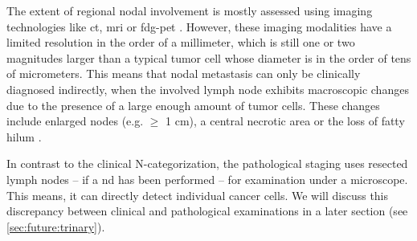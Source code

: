 \documentclass[\relativeRoot/main.tex]{subfiles}
\begin{document}
The extent of regional nodal involvement is mostly assessed using imaging technologies like \gls{ct}, \gls{mri} or \gls{fdg-pet} \cite{johnson_head_2020,van_den_bosch_18f-fdg-petct-based_2020}. However, these imaging modalities have a limited resolution in the order of a millimeter, which is still one or two magnitudes larger than a typical tumor cell whose diameter is in the order of tens of micrometers. This means that nodal metastasis can only be clinically diagnosed indirectly, when the involved lymph node exhibits macroscopic changes due to the presence of a large enough amount of tumor cells. These changes include enlarged nodes (e.g. $\geq$ 1 cm), a central necrotic area or the loss of fatty hilum \cite{pillsbury_iii_rationale_1997,biau_selection_2019,ludwig_dataset_2022}.

In contrast to the clinical N-categorization, the pathological staging uses resected lymph nodes -- if a \acrlong{nd} has been performed -- for examination under a microscope. This means, it can directly detect individual cancer cells. We will discuss this discrepancy between clinical and pathological examinations in a later section (see \cref{sec:future:trinary}).
\end{document}
